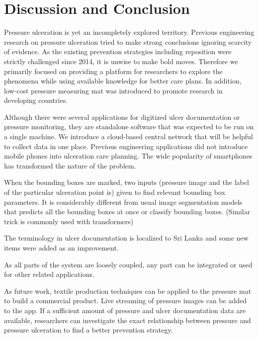 \chapter{Discussion and Conclusion}

Pressure ulceration is yet an incompletely explored territory. Previous engineering research on pressure ulceration tried to make strong conclusions ignoring scarcity of evidence. As the existing prevention strategies including reposition were strictly challenged since 2014, it is unwise to make bold moves. Therefore we primarily focused on providing a platform for researchers to explore the phenomena while using available knowledge for better care plans. In addition, low-cost pressure measuring mat was introduced to promote research in developing countries. 

Although there were several applications for digitized ulcer documentation or pressure monitoring, they are standalone software that was expected to be run on a single machine. We introduce a cloud-based central network that will be helpful to collect data in one place. Previous engineering applications did not introduce mobile phones into ulceration care planning. The wide popularity of smartphones has transformed the nature of the problem. 

When the bounding boxes are marked, two inputs (pressure image and the label of the particular ulceration point is) given to find relevant bounding box parameters. It is considerably different from usual image segmentation models that predicts all the bounding boxes at once or classify bounding boxes. (Similar trick is commonly used with transformers) 

The terminology in ulcer documentation is localized to Sri Lanka and some new items were added as an improvement.

As all parts of the system are loosely coupled, any part can be integrated or used for other related applications.

As future work, textile production techniques can be applied to the pressure mat to build a commercial product. Live streaming of pressure images can be added to the app. If a sufficient amount of pressure and ulcer documentation data are available, researchers can investigate the exact relationship between pressure and pressure ulceration to find a better prevention strategy.


